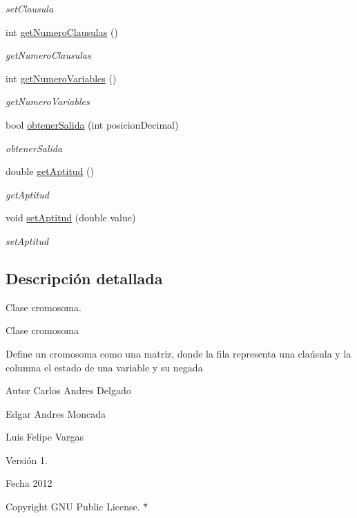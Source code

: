\begin{DoxyCompactItemize}
\begin{DoxyCompactList}\small\item\em set\-Clausula \end{DoxyCompactList}\item 
int \hyperlink{classCromosoma_a53e4a3cda8f7a0b2233f0219579f7cc3}{get\-Numero\-Clausulas} ()
\begin{DoxyCompactList}\small\item\em get\-Numero\-Clausulas \end{DoxyCompactList}\item 
int \hyperlink{classCromosoma_a825104a1dd2a7595d119907c84fd2fd1}{get\-Numero\-Variables} ()
\begin{DoxyCompactList}\small\item\em get\-Numero\-Variables \end{DoxyCompactList}\item 
bool \hyperlink{classCromosoma_a8a75eb52e417f9c050c32969b56984e7}{obtener\-Salida} (int posicion\-Decimal)
\begin{DoxyCompactList}\small\item\em obtener\-Salida \end{DoxyCompactList}\item 
double \hyperlink{classCromosoma_a280c8232e95aec0c8dd627cd579abec6}{get\-Aptitud} ()
\begin{DoxyCompactList}\small\item\em get\-Aptitud \end{DoxyCompactList}\item 
void \hyperlink{classCromosoma_a158f2fe672e3232ebf07a5724a15fc2e}{set\-Aptitud} (double value)
\begin{DoxyCompactList}\small\item\em set\-Aptitud \end{DoxyCompactList}\end{DoxyCompactItemize}


\subsection{Descripción detallada}
Clase cromosoma. 

\begin{DoxyVerb}Clase cromosoma
\end{DoxyVerb}


Define un cromosoma como una matriz, donde la fila representa una claúsula y la columna el estado de una variable y su negada \begin{DoxyAuthor}{Autor}
Carlos Andres Delgado 

Edgar Andres Moncada 

Luis Felipe Vargas 
\end{DoxyAuthor}
\begin{DoxyVersion}{Versión}
1. 
\end{DoxyVersion}
\begin{DoxyDate}{Fecha}
2012 
\end{DoxyDate}
\begin{DoxyCopyright}{Copyright}
G\-N\-U Public License. $\ast$ 
\end{DoxyCopyright}


